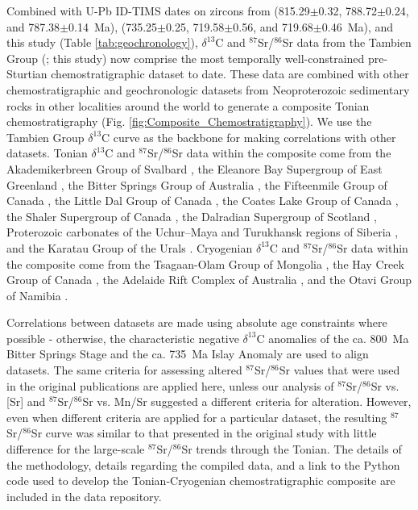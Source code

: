 \documentclass[11pt,letterpaper]{article}
\newcommand{\dC}{$\delta^{13}$C\xspace}
\newcommand{\SrSr}{$^{87}$Sr/$^{86}$Sr\xspace}
\begin{document}
Combined with U-Pb ID-TIMS dates on zircons from \citet{Swanson-Hysell2015a} (815.29$\pm$0.32, 788.72$\pm$0.24, and 787.38$\pm$0.14~Ma), \citet{MacLennan2018a} (735.25$\pm$0.25, 719.58$\pm$0.56, and 719.68$\pm$0.46~Ma), and this study (Table \ref{tab:geochronology}), \dC and \SrSr data from the Tambien Group (\citealp{Miller2009a, Swanson-Hysell2015a}; this study) now comprise the most temporally well-constrained pre-Sturtian chemostratigraphic dataset to date. These data are combined with other chemostratigraphic and geochronologic datasets from Neoproterozoic sedimentary rocks in other localities around the world to generate a composite Tonian chemostratigraphy (Fig. \ref{fig:Composite_Chemostratigraphy}). We use the Tambien Group \dC curve as the backbone for making correlations with other datasets. Tonian \dC and \SrSr data within the composite come from the Akademikerbreen Group of Svalbard \citep{Halverson2007b,Halverson2007a}, the Eleanore Bay Supergroup of East Greenland \citep{Cox2016a}, the Bitter Springs Group of Australia \citep{Swanson-Hysell2010a, Cox2016a}, the Fifteenmile Group of Canada \citep{Macdonald2010a, Cox2016a}, the Little Dal Group of Canada \citep{Halverson2006a, Halverson2007b}, the Coates Lake Group of Canada \citep{Halverson2006a, Halverson2007b, Rooney2014a}, the Shaler Supergroup of Canada \citep{Asmerom1991a, Jones2010a}, the Dalradian Supergroup of Scotland \citep{Sawaki2010a}, Proterozoic carbonates of the Uchur–Maya and Turukhansk regions of Siberia \citep{Bartley2001a, Cox2016a}, and the Karatau Group of the Urals \citep{Kuznetsov2006a, Cox2016a}. Cryogenian \dC and \SrSr data within the composite come from the Tsagaan-Olam Group of Mongolia \citep{Brasier1996a, Bold2016a}, the Hay Creek Group of Canada \citep{Rooney2014a}, the Adelaide Rift Complex of Australia \citep{Swanson-Hysell2010a, Rose2012a}, and the Otavi Group of Namibia \citep{Halverson2005a, Halverson2007b}.

Correlations between datasets are made using absolute age constraints where possible - otherwise, the characteristic negative \dC anomalies of the ca. 800~Ma Bitter Springs Stage and the ca. 735~Ma Islay Anomaly are used to align datasets. The same criteria for assessing altered \SrSr values that were used in the original publications are applied here, unless our analysis of \SrSr vs. [Sr] and \SrSr vs. Mn/Sr suggested a different criteria for alteration. However, even when different criteria are applied for a particular dataset, the resulting \SrSr curve was similar to that presented in the original study with little difference for the large-scale \SrSr trends through the Tonian. The details of the methodology, details regarding the compiled data, and a link to the Python code used to develop the Tonian-Cryogenian chemostratigraphic composite are included in the data repository.
\end{document}
